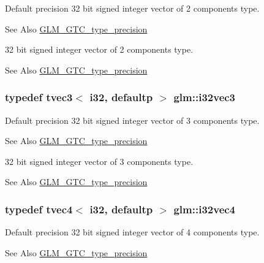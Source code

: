 Default precision 32 bit signed integer vector of 2 components type. \begin{DoxySeeAlso}{See Also}
\hyperlink{group__gtc__type__precision}{G\-L\-M\-\_\-\-G\-T\-C\-\_\-type\-\_\-precision}
\end{DoxySeeAlso}
32 bit signed integer vector of 2 components type. \begin{DoxySeeAlso}{See Also}
\hyperlink{group__gtc__type__precision}{G\-L\-M\-\_\-\-G\-T\-C\-\_\-type\-\_\-precision} 
\end{DoxySeeAlso}
\hypertarget{group__gtc__type__precision_gab67e08f6a4b1bce82a9a34ecb2bfba64}{
\subsubsection[{i32vec3}]{\setlength{\rightskip}{0pt plus 5cm}typedef tvec3$<$ i32, defaultp $>$ {\bf glm\-::i32vec3}}}\label{group__gtc__type__precision_gab67e08f6a4b1bce82a9a34ecb2bfba64}
Default precision 32 bit signed integer vector of 3 components type. \begin{DoxySeeAlso}{See Also}
\hyperlink{group__gtc__type__precision}{G\-L\-M\-\_\-\-G\-T\-C\-\_\-type\-\_\-precision}
\end{DoxySeeAlso}
32 bit signed integer vector of 3 components type. \begin{DoxySeeAlso}{See Also}
\hyperlink{group__gtc__type__precision}{G\-L\-M\-\_\-\-G\-T\-C\-\_\-type\-\_\-precision} 
\end{DoxySeeAlso}
\hypertarget{group__gtc__type__precision_ga3ada3676600db65a425058c0a150d83e}{
\subsubsection[{i32vec4}]{\setlength{\rightskip}{0pt plus 5cm}typedef tvec4$<$ i32, defaultp $>$ {\bf glm\-::i32vec4}}}\label{group__gtc__type__precision_ga3ada3676600db65a425058c0a150d83e}
Default precision 32 bit signed integer vector of 4 components type. \begin{DoxySeeAlso}{See Also}
\hyperlink{group__gtc__type__precision}{G\-L\-M\-\_\-\-G\-T\-C\-\_\-type\-\_\-precision}
\end{DoxySeeAlso}
